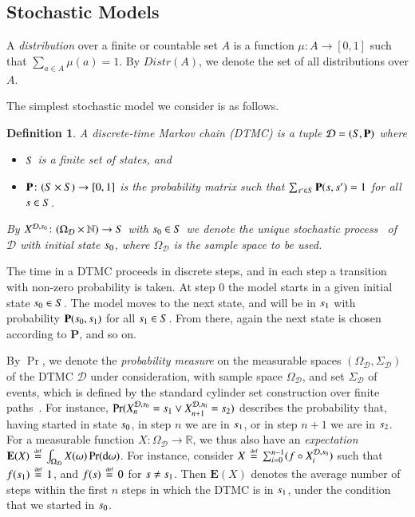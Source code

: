 \documentclass[10pt,twocolumn]{article}
\newtheorem{definition}{Definition}
\DeclareMathOperator{\prob}{Pr}
\newcommand{\states} {{\ensuremath S}}
\newcommand{\state}  {{\ensuremath s}}
\newcommand{\distr}  {{\ensuremath {\mu}}}
\newcommand{\distrs} {{\ensuremath {\mathit{Distr}}}}
\newcommand{\nats}    {{\ensuremath {\mathbb{N}}}}
\newcommand{\reals}  {{\ensuremath {\mathbb{R}}}}
\newcommand{\pmat}{\mathbf{P}}
\newcommand{\dmodel}{\mathcal{D}}
\newcommand{\diff}{\mathrm{d}}
\newcommand{\expect}{\mathbf{E}}
\newcommand{\stopro}{X}
\newcommand{\samspace}[1]{\Omega_{#1}}
\newcommand{\defeq}{\,\stackrel{\mbox{\rm {\tiny def}}}{=}\,}
\begin{document}
\subsection{Stochastic Models}
\label{subsec:stochastic_models}

\noindent A \emph{distribution} over a finite or countable set $A$ is a function $\distr\colon A \to
[0,1]$ such that $\sum_{a \in A} \distr(a) = 1$. By $\distrs(A)$, we
denote the set of all distributions over $A$. 

The simplest stochastic model we consider is as follows.
\begin{definition}
  \label{def:dtmc}
A \emph{discrete-time Markov chain (DTMC)} is a tuple $\dmodel = (\states, \pmat)$ where
\begin{itemize}
  \item $\states$ is a finite set of \emph{states}, and
  \item $\pmat\colon (\states \times \states) \to [0,1]$ is the \emph{probability matrix} such that $\sum_{\state' \in \states} \pmat(\state, \state') = 1$ for all $\state \in \states$.
  \end{itemize}
By $\stopro^{\dmodel,\state_0}\colon (\samspace{\dmodel} \times \nats) \to \states$ with $\state_0 \in \states$ we denote the unique stochastic process~\cite{Stewart94} of $\dmodel$ with initial state $\state_0$, where $\samspace{\dmodel}$ is the sample space to be used.
\end{definition}
The time in a DTMC proceeds in discrete steps, and in each step a transition with non-zero probability is taken.
At step $0$ the model starts in a given initial state $\state_0 \in \states$.
The model moves to the next state, and will be in $\state_1$ with probability $\pmat(\state_0, \state_1)$ for all $\state_1 \in \states$.
From there, again the next state is chosen according to $\pmat$, and so on.

By $\prob$, we denote the \emph{probability measure} on the measurable spaces $(\Omega_{\dmodel},\Sigma_{\dmodel})$ 
of the DTMC $\dmodel$ under consideration, with sample space $\Omega_{\dmodel}$, and set $\Sigma_{\dmodel}$ of events,
which is defined by the standard cylinder set construction over finite paths~\cite{KSK66}.
For instance, $\prob(\stopro^{\dmodel,\state_0}_n = \state_1 \vee \stopro^{\dmodel,\state_0}_{n+1} = \state_2)$
describes the probability that, having started in state $\state_0$, in step $n$ we are in $\state_1$, or in step $n+1$ we are in $\state_2$.
For a measurable function $X\colon \Omega_{\dmodel} \to \reals$, we thus also have an \emph{expectation} $\expect(X) \defeq \int_{\Omega_{\dmodel}} X(\omega) \prob(\diff \omega)$.
For instance, consider $X \defeq \sum_{i=0}^{n-1} (f \circ \stopro^{\dmodel,\state_0}_i)$ such that $f(\state_1) \defeq 1$, and $f(\state) \defeq 0$ for $\state \neq \state_1$.
Then $\expect(X)$ denotes the average number of steps within the first $n$ steps in which the DTMC is in $\state_1$, under the condition that we started in $\state_0$.
\end{document}
